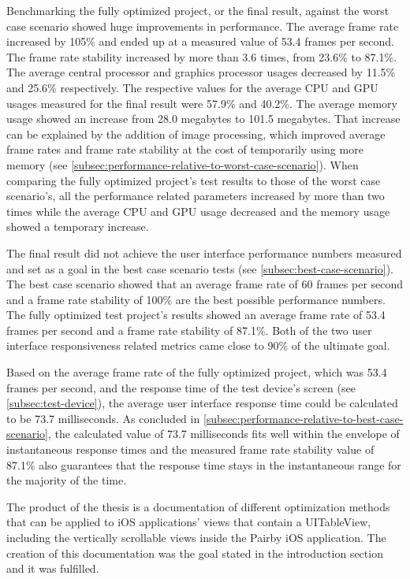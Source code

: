 \documentclass[a4paper,12pt]{article}
\begin{document}
Benchmarking the fully optimized project, or the final result, against the worst case scenario showed huge improvements in performance. The average frame rate increased by 105\% and ended up at a measured value of 53.4 frames per second. The frame rate stability increased by more than 3.6 times, from 23.6\% to 87.1\%. The average central processor and graphics processor usages decreased by 11.5\% and 25.6\% respectively. The respective values for the average CPU and GPU usages measured for the final result were 57.9\% and 40.2\%. The average memory usage showed an increase from 28.0 megabytes to 101.5 megabytes. That increase can be explained by the addition of image processing, which improved average frame rates and frame rate stability at the cost of temporarily using more memory (see \autoref{subsec:performance-relative-to-worst-case-scenario}). When comparing the fully optimized project's test results to those of the worst case scenario's, all the performance related parameters increased by more than two times while the average CPU and GPU usage decreased and the memory usage showed a temporary increase.

The final result did not achieve the user interface performance numbers measured and set as a goal in the best case scenario tests (see \autoref{subsec:best-case-scenario}). The best case scenario showed that an average frame rate of 60 frames per second and a frame rate stability of 100\% are the best possible performance numbers. The fully optimized test project's results showed an average frame rate of 53.4 frames per second and a frame rate stability of 87.1\%. Both of the two user interface responsiveness related metrics came close to 90\% of the ultimate goal.

Based on the average frame rate of the fully optimized project, which was 53.4 frames per second, and the response time of the test device's screen (see \autoref{subsec:test-device}), the average user interface response time could be calculated to be 73.7 milliseconds. As concluded in \autoref{subsec:performance-relative-to-best-case-scenario}, the calculated value of 73.7 milliseconds fits well within the envelope of instantaneous response times and the measured frame rate stability value of 87.1\% also guarantees that the response time stays in the instantaneous range for the majority of the time.

The product of the thesis is a documentation of different optimization methods that can be applied to iOS applications' views that contain a UITableView, including the vertically scrollable views inside the Pairby iOS application. The creation of this documentation was the goal stated in the introduction section and it was fulfilled.
\end{document}
